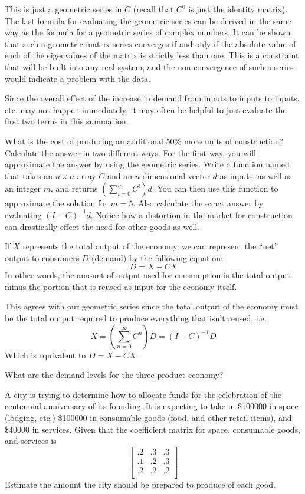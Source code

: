 This is just a geometric series in $C$ (recall that $C^0$ is just the identity matrix).
The last formula for evaluating the geometric series can be derived in the same way as the formula for a geometric series of complex numbers.
It can be shown that such a geometric matrix series converges if and only if the absolute value of each of the eigenvalues of the matrix is strictly less than one.
This is a constraint that will be built into any real system, and the non-convergence of such a series would indicate a problem with the data.

Since the overall effect of the increase in demand from inputs to inputs to inputs, etc. may not happen immediately, it may often be helpful to just evaluate the first two terms in this summation.

\begin{problem}
What is the cost of producing an additional 50\% more units of construction?
Calculate the answer in two different ways.
For the first way, you will approximate the answer by using the geometric series.
Write a function named  that takes an $n \times n$ array $C$ and an $n$-dimensional
vector $d$ as inputs, as well as an integer $m$, and returns $(\sum_{i=0}^m C^i)d$.
You can then use this function to approximate the solution for $m=5$.
Also calculate the exact answer by evaluating $(I-C)^{-1}d$.
Notice how a distortion in the market for construction can drastically effect the need for other goods as well.
\end{problem}

If $X$ represents the total output of the economy, we can represent the ``net'' output to consumers $D$ (demand) by the following equation:
\[ D = X - C X \]
In other words, the amount of output used for consumption is the total output minus the portion that is reused as input for the economy itself.

This agrees with our geometric series since the total output of the economy must be the total output required to produce everything that isn't reused, i.e.
\[ X = \left( \sum_{n=0}^{\infty} C^n \right) D = \left( I - C \right)^{-1} D \]
Which is equivalent to $ D = X - C X $.

\begin{problem}
What are the demand levels for the three product economy?
\end{problem}

\begin{problem}
A city is trying to determine how to allocate funds for the celebration of the centennial anniversary of its founding.
It is expecting to take in \$100000 in space (lodging, etc.) \$100000 in consumable goods (food, and other retail items), and \$40000 in services.
Given that the coefficient matrix for space, consumable goods, and services is
\[ \begin{bmatrix}
.2 & .3 & .3 \\
.1 & .2 & .3 \\
.2 & .2 & .2 \\
\end{bmatrix} \]
Estimate the amount the city should be prepared to produce of each good.
\end{problem}


